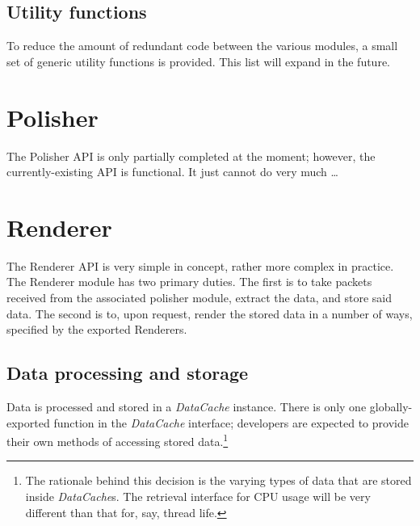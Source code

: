 \subsection{Utility functions}
To reduce the amount of redundant code between the various modules, a small set of generic utility functions is
provided. This list will expand in the future.


\section{Polisher}
The Polisher API is only partially completed at the moment; however, the currently-existing API is functional. It just
cannot do very much \ldots

\section{Renderer}
The Renderer API is very simple in concept, rather more complex in practice. The Renderer module has two primary
duties. The first is to take packets received from the associated polisher module, extract the data, and store said
data. The second is to, upon request, render the stored data in a number of ways, specified by the exported Renderers.

\subsection{Data processing and storage}
Data is processed and stored in a \emph{DataCache} instance. There is only one globally-exported function in the
\emph{DataCache} interface; developers are expected to provide their own methods of accessing stored data.\footnote{The
rationale behind this decision is the varying types of data that are stored inside \emph{DataCache}s. The retrieval
interface for CPU usage will be very different than that for, say, thread life.}


